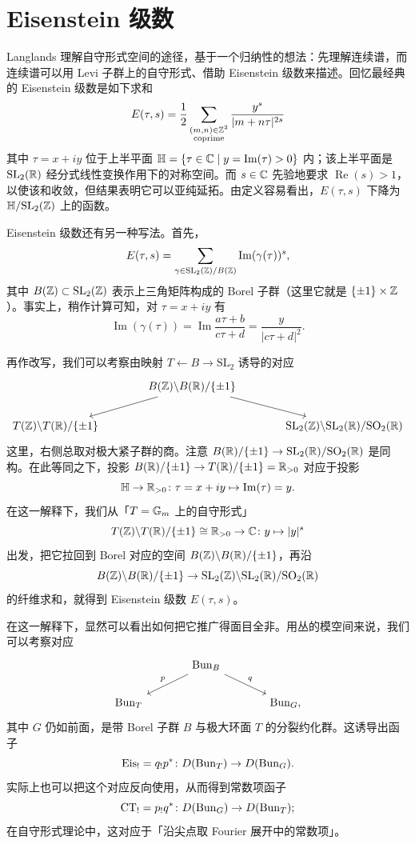 \section{Eisenstein 级数}
\providecommand{\HH}{\mathbb{H}}%

Langlands 理解自守形式空间的途径，基于一个归纳性的想法：先理解连续谱，而连续谱可以用 Levi 子群上的自守形式、借助 Eisenstein 级数来描述。回忆最经典的 Eisenstein 级数是如下求和
\[
E(\tau,s)=\frac{1}{2}\sum_{\substack{(m,n)\in\mathbb{Z}^{2}\\ \text{coprime}}}\frac{y^{s}}{|m+n\tau|^{2s}}
\]
其中 $\tau=x+iy$ 位于上半平面 $\HH=\{\tau\in\C\mid y=\operatorname{Im}(\tau)>0\}$ 内；该上半平面是 $\mathrm{SL}_2(\mathbb{R})$ 经分式线性变换作用下的对称空间。而 $s\in\mathbb{C}$ 先验地要求 $\operatorname{Re}(s)>1$，以使该和收敛，但结果表明它可以亚纯延拓。由定义容易看出，$E(\tau,s)$ 下降为 $\HH/\mathrm{SL}_2(\Z)$ 上的函数。

Eisenstein 级数还有另一种写法。首先，
\[
E(\tau,s)=\sum_{\gamma\in\mathrm{SL}_2(\mathbb{Z})/B(\mathbb{Z})}\operatorname{Im}(\gamma(\tau))^{s},
\]
其中 $B(\mathbb{Z})\subset\mathrm{SL}_2(\mathbb{Z})$ 表示上三角矩阵构成的 Borel 子群（这里它就是 $\{\pm1\}\times\mathbb{Z}$）。事实上，稍作计算可知，对 $\tau=x+iy$ 有
\[
\operatorname{Im}(\gamma(\tau))=\operatorname{Im}\frac{a\tau+b}{c\tau+d}=\frac{y}{|c\tau+d|^{2}}.
\]

再作改写，我们可以考察由映射 $T\leftarrow B\to\mathrm{SL}_2$ 诱导的对应
\[
\begin{tikzcd}[column sep=large]
& B(\Z)\backslash B(\R)/\{\pm1\} \arrow[dl] \arrow[dr] & \\
T(\Z)\backslash T(\R)/\{\pm1\} & & \mathrm{SL}_2(\Z)\backslash\mathrm{SL}_2(\R)/\mathrm{SO}_2(\R)
\end{tikzcd}
\]
这里，右侧总取对极大紧子群的商。注意 $B(\mathbb{R})/\{\pm1\}\to\mathrm{SL}_2(\mathbb{R})/\mathrm{SO}_2(\mathbb{R})$ 是同构。在此等同之下，投影 $B(\mathbb{R})/\{\pm1\}\to T(\mathbb{R})/\{\pm1\}=\mathbb{R}_{>0}$ 对应于投影
\[
\HH\to\R_{>0}\colon \tau=x+iy\mapsto\operatorname{Im}(\tau)=y.
\]
在这一解释下，我们从「$T=\mathbb{G}_m$ 上的自守形式」
\[
T(\mathbb{Z})\backslash T(\mathbb{R})/\{\pm1\}\cong\mathbb{R}_{>0}\to\mathbb{C}\colon y\mapsto|y|^{s}
\]
出发，把它拉回到 Borel 对应的空间 $B(\mathbb{Z})\backslash B(\mathbb{R})/\{\pm1\}$，再沿
\[
B(\mathbb{Z})\backslash B(\mathbb{R})/\{\pm1\}\to\mathrm{SL}_2(\mathbb{Z})\backslash\mathrm{SL}_2(\mathbb{R})/\mathrm{SO}_2(\mathbb{R})
\]
的纤维求和，就得到 Eisenstein 级数 $E(\tau,s)$。

在这一解释下，显然可以看出如何把它推广得面目全非。用丛的模空间来说，我们可以考察对应
\[
\begin{tikzcd}[column sep=large]
& \Bun_B \arrow[dl,"p"'] \arrow[dr,"q"] & \\
\Bun_T & & \Bun_G,
\end{tikzcd}
\]
其中 $G$ 仍如前面，是带 Borel 子群 $B$ 与极大环面 $T$ 的分裂约化群。这诱导出函子
\[
\operatorname{Eis}_{!}=q_{!}p^{*}\colon D(\operatorname{Bun}_T)\to D(\operatorname{Bun}_G).
\]
实际上也可以把这个对应反向使用，从而得到常数项函子
\[
\operatorname{CT}_{!}=p_{!}q^{*}\colon D(\operatorname{Bun}_G)\to D(\operatorname{Bun}_T);
\]
在自守形式理论中，这对应于「沿尖点取 Fourier 展开中的常数项」。

